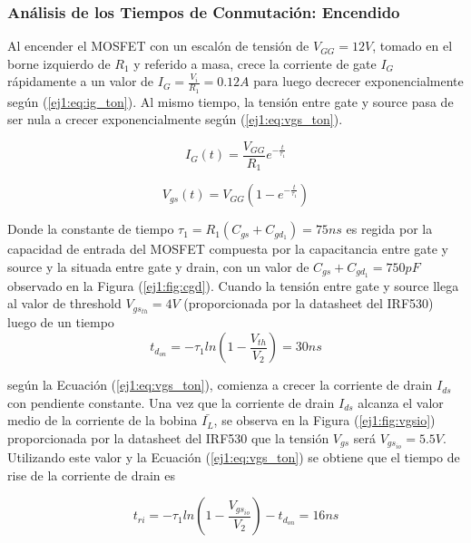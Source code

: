 \subsubsection{Análisis de los Tiempos de Conmutación: Encendido}

Al encender el MOSFET con un escalón de tensión de $V_{GG} = 12V$, tomado en el borne izquierdo de $R_1$ y referido a masa, crece la corriente de gate $I_G$ rápidamente a un valor de $I_G = \frac{V_i}{R_1} = 0.12A$ para luego decrecer exponencialmente según (\ref{ej1:eq:ig_ton}). Al mismo tiempo, la tensión entre gate y source pasa de ser nula a crecer exponencialmente según (\ref{ej1:eq:vgs_ton}).

\begin{equation}
I_G(t) = \frac{V_{GG}}{R_1}e^{-\frac{t}{\tau_1}}
\label{ej1:eq:ig_ton}
\end{equation}

\begin{equation}
V_{gs}(t) = V_{GG}(1-e^{-\frac{t}{\tau_1}})
\label{ej1:eq:vgs_ton}
\end{equation}

Donde la constante de tiempo $\tau_1 = R_1 (C_{gs}+C_{gd_{1}}) = 75ns$ es regida por la capacidad de entrada del MOSFET compuesta por la capacitancia entre gate y source y la situada entre gate y drain, con un valor de $C_{gs}+C_{gd_{1}} = 750pF$ observado en la Figura (\ref{ej1:fig:cgd}). Cuando la tensión entre gate y source llega al valor de threshold $V_{gs_{th}} = 4V$ (proporcionada por la datasheet del IRF530) luego de un tiempo 
\begin{equation}
t_{d_{on}} = -\tau_1 ln\left( 1-\frac{V_{th}}{V_2} \right) = 30ns
\label{ej1:eq:tdon}
\end{equation}

según la Ecuación (\ref{ej1:eq:vgs_ton}), comienza a crecer la corriente de drain $I_{ds}$ con pendiente constante. Una vez que la corriente de drain $I_{ds}$ alcanza el valor medio de la corriente de la bobina $\bar{I_L}$, se observa en la Figura (\ref{ej1:fig:vgsio}) proporcionada por la datasheet del IRF530 que la tensión $V_{gs}$ será $V_{gs_{io}} = 5.5V$. Utilizando este valor y la Ecuación (\ref{ej1:eq:vgs_ton}) se obtiene que el tiempo de rise de la corriente de drain es

\begin{equation}
	t_{ri} = -\tau_1 ln\left( 1-\frac{V_{gs_{io}}}{V_2} \right) -t_{d_{on}} = 16ns
\label{ej1:eq:trise}
\end{equation}

